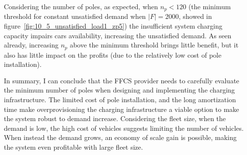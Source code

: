 Considering the number of poles, as expected, when $n_p<120$ (the minimum threshold for constant unsatisfied demand when $|F|=2000$, showed in figure~\ref{fig:10_5_unsatisfied_load1_zp5}) the insufficient system charging capacity impairs cars availability, increasing the unsatisfied demand. 
As seen already, increasing $n_p$ above the minimum threshold brings little benefit, but it also has little impact on the profits (due to the relatively low cost of pole installation). 

In summary, I can conclude that the FFCS provider needs to carefully evaluate the minimum number of poles when designing and implementing the charging infrastructure. The limited cost of pole installation, and the long amortization time make overprovisioning the charging infrastructure a viable option to make the system robust to demand increase.
Considering the fleet size, when the demand is low, the high cost of vehicles suggests limiting the number of vehicles. When instead the demand grows, an economy of scale gain is possible, making the system even profitable with large fleet size.





